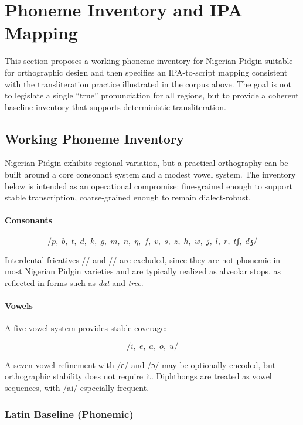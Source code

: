 \documentclass[12pt]{article}
\begin{document}
\section{Phoneme Inventory and IPA Mapping}

This section proposes a working phoneme inventory for Nigerian Pidgin suitable for orthographic design and then specifies an IPA-to-script mapping consistent with the transliteration practice illustrated in the corpus above. The goal is not to legislate a single ``true'' pronunciation for all regions, but to provide a coherent baseline inventory that supports deterministic transliteration.

\subsection{Working Phoneme Inventory}

Nigerian Pidgin exhibits regional variation, but a practical orthography can be built around a core consonant system and a modest vowel system. The inventory below is intended as an operational compromise: fine-grained enough to support stable transcription, coarse-grained enough to remain dialect-robust.

\paragraph{Consonants}

\[
/p,\; b,\; t,\; d,\; k,\; g,\;
m,\; n,\; \eta,\;
f,\; v,\; s,\; z,\; h,\;
w,\; j,\;
l,\; r,\;
tʃ,\; dʒ/
\]

Interdental fricatives /\texttheta/ and /\dh/ are excluded, since they are not phonemic in most Nigerian Pidgin varieties and are typically realized as alveolar stops, as reflected in forms such as \textit{dat} and \textit{tree}.

\paragraph{Vowels}

A five-vowel system provides stable coverage:

\[
/i,\; e,\; a,\; o,\; u/
\]

A seven-vowel refinement with /ɛ/ and /ɔ/ may be optionally encoded, but orthographic stability does not require it. Diphthongs are treated as vowel sequences, with /ai/ especially frequent.

\subsubsection{Latin Baseline (Phonemic)}
\end{document}

